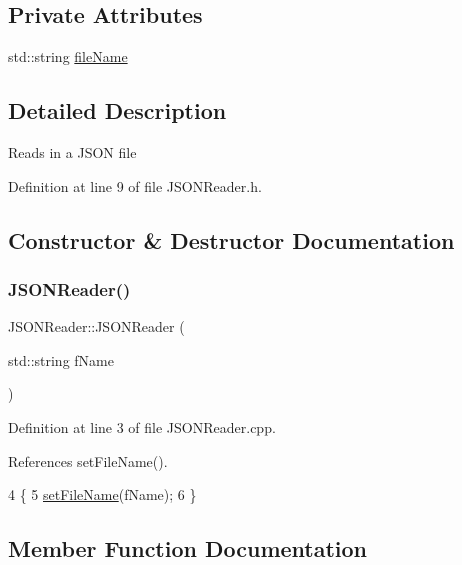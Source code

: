 \subsection*{Private Attributes}
\begin{DoxyCompactItemize}
\item 
std\+::string \hyperlink{class_j_s_o_n_reader_abae0923ae887d87350b9ca1ddd56d41e}{file\+Name}
\end{DoxyCompactItemize}


\subsection{Detailed Description}
Reads in a J\+S\+ON file 

Definition at line 9 of file J\+S\+O\+N\+Reader.\+h.



\subsection{Constructor \& Destructor Documentation}
\mbox{\label{class_j_s_o_n_reader_aa1480326d69874d2bab7183932b2d495}} 
\subsubsection{\texorpdfstring{J\+S\+O\+N\+Reader()}{JSONReader()}}
{\footnotesize\ttfamily J\+S\+O\+N\+Reader\+::\+J\+S\+O\+N\+Reader (\begin{DoxyParamCaption}\item[{std\+::string}]{f\+Name }\end{DoxyParamCaption})}



Definition at line 3 of file J\+S\+O\+N\+Reader.\+cpp.



References set\+File\+Name().


\begin{DoxyCode}
4 \{
5     \hyperlink{class_j_s_o_n_reader_ac9652f637597153cffe536fd2112c4f2}{setFileName}(fName);
6 \}
\end{DoxyCode}


\subsection{Member Function Documentation}
\mbox{\label{class_j_s_o_n_reader_abde6e34eccb5e195218923b8260391b2}} 
